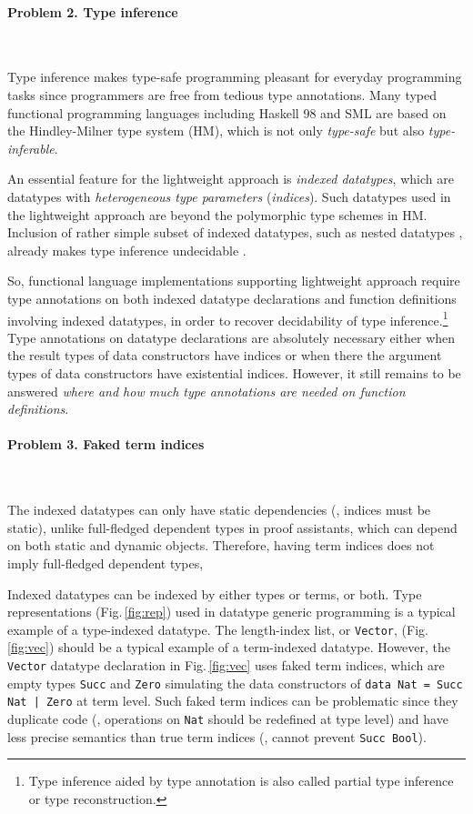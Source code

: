 \paragraph{Problem 2. \textbf{Type inference}} ~

Type inference makes type-safe programming pleasant for everyday programming
tasks since programmers are free from tedious type annotations.
Many typed functional programming languages including Haskell 98 and SML
are based on the Hindley-Milner type system (HM), which is not only
\emph{type-safe} but also \emph{type-inferable}.

An essential feature for the lightweight approach is \emph{indexed datatypes},
which are datatypes with \emph{heterogeneous type parameters}
(\aka \emph{indices}). Such datatypes used in the lightweight approach are
beyond the polymorphic type schemes in HM. Inclusion of rather simple subset of
indexed datatypes, such as nested datatypes \cite{BirMee98}, already makes
type inference undecidable \cite{Henglein93}.

So, functional language implementations supporting lightweight approach
require type annotations on both indexed datatype declarations and
function definitions involving indexed datatypes, in order to recover
decidability of type inference.\footnote{
	Type inference aided by type annotation is also called
	partial type inference or type reconstruction.}
Type annotations on datatype declarations are absolutely necessary
either when the result types of data constructors have indices
or when there the argument types of data constructors have existential indices.
However, it still remains to be answered
\emph{where and how much type annotations are needed on function definitions}.

\paragraph{Problem 3. \textbf{Faked term indices}} ~

The indexed datatypes can only have static dependencies
(\ie, indices must be static), unlike full-fledged dependent types
in proof assistants, which can depend on both static and dynamic objects.
Therefore, having term indices does not imply full-fledged dependent types,

Indexed datatypes can be indexed by either types or terms, or both.
Type representations \cite{CheHin03} (Fig.\,\ref{fig:rep}) used in
datatype generic programming is a typical example of a type-indexed datatype.
The length-index list, or \texttt{Vector}, (Fig.\,\ref{fig:vec})
should be a typical example of a term-indexed datatype.
However, the \texttt{Vector} datatype declaration in Fig.\,\ref{fig:vec}
uses faked term indices, which are empty types \verb|Succ| and \verb|Zero|
simulating the data constructors of \verb/data Nat = Succ Nat | Zero/
at term level. Such faked term indices can be problematic since
they duplicate code (\ie, operations on \texttt{Nat} should be redefined
at type level) and have less precise semantics than true term indices
(\eg, cannot prevent \texttt{Succ Bool}).

